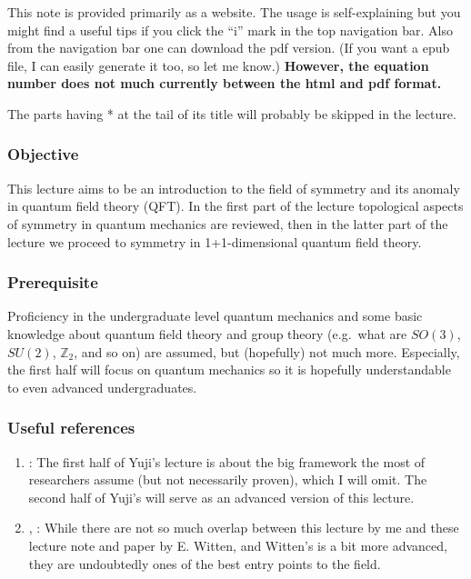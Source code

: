 \documentclass[
]{scrartcl}
\providecommand{\tightlist}{%
  \setlength{\itemsep}{0pt}\setlength{\parskip}{0pt}}
\numberwithin{equation}{section}
\theoremstyle{definition}
\theoremstyle{definition}
\theoremstyle{definition}
\theoremstyle{definition}
\theoremstyle{remark}
\begin{document}
This note is provided primarily as a website.
The usage is self-explaining but you might find a useful tips if you click the ``i'' mark in the top navigation bar. Also from the navigation bar one can download the pdf version. (If you want a epub file, I can easily generate it too, so let me know.) \textbf{However, the equation number does not much currently between the html and pdf format.}

The parts having * at the tail of its title will probably be skipped in the lecture.

\hypertarget{objective}{%
\subsubsection{Objective}\label{objective}}

This lecture aims to be an introduction to the field of symmetry and its anomaly in quantum field theory (QFT). In the first part of the lecture topological aspects of symmetry in quantum mechanics are reviewed, then in the latter part of the lecture we proceed to symmetry in 1+1-dimensional quantum field theory.

\hypertarget{prerequisite}{%
\subsubsection{Prerequisite}\label{prerequisite}}

Proficiency in the undergraduate level quantum mechanics and some basic knowledge about quantum field theory and group theory (e.g.~what are \(SO(3)\), \(SU(2)\), \(\mathbb{Z}_2\), and so on) are assumed, but (hopefully) not much more. Especially, the first half will focus on quantum mechanics so it is hopefully understandable to even advanced undergraduates.

\hypertarget{othernotes}{%
\subsubsection{Useful references}\label{othernotes}}

\begin{enumerate}
\def\labelenumi{\arabic{enumi}.}
\tightlist
\item
  \textcite{tachikawa_2019}:
  The first half of Yuji's lecture is about the big framework the most of researchers assume (but not necessarily proven), which I will omit.
  The second half of Yuji's will serve as an advanced version of this lecture.
\item
  \textcite{Witten:2015aoa}, \textcite{Witten:2015aba}:
  While there are not so much overlap between this lecture by me and these lecture note and paper by E. Witten, and Witten's is a bit more advanced, they are undoubtedly ones of the best entry points to the field.
\end{enumerate}
\end{document}
